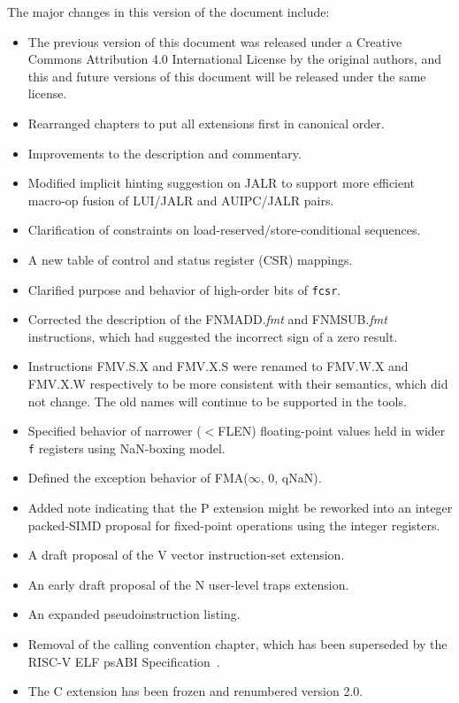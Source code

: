 The major changes in this version of the document include:
\begin{itemize}
\parskip 0pt
\itemsep 1pt
\item The previous version of this document was released under a
  Creative Commons Attribution 4.0 International License by the
  original authors, and this and future versions of this document will
  be released under the same license.
\item Rearranged chapters to put all extensions first in canonical order.
\item Improvements to the description and commentary.
\item Modified implicit hinting suggestion on JALR to support more efficient
  macro-op fusion of LUI/JALR and AUIPC/JALR pairs.
\item Clarification of constraints on load-reserved/store-conditional sequences.
\item A new table of control and status register (CSR) mappings.
\item Clarified purpose and behavior of high-order bits of {\tt fcsr}.
\item Corrected the description of the FNMADD.{\em fmt} and FNMSUB.{\em fmt}
      instructions, which had suggested the incorrect sign of a zero result.
\item Instructions FMV.S.X and FMV.X.S were renamed to FMV.W.X and
  FMV.X.W respectively to be more consistent with their
  semantics, which did not change.
  The old names will continue to be supported in the tools.
\item Specified behavior of narrower ($<$FLEN) floating-point values held in
  wider {\tt f} registers using NaN-boxing model.
\item Defined the exception behavior of FMA($\infty$, 0, qNaN).
\item Added note indicating that the P extension might be reworked
  into an integer packed-SIMD proposal for fixed-point operations
  using the integer registers.
\item A draft proposal of the V vector instruction-set extension.
\item An early draft proposal of the N user-level traps extension.
\item An expanded pseudoinstruction listing.
\item Removal of the calling convention chapter, which has been superseded by
      the RISC-V ELF psABI Specification~\cite{riscv-elf-psabi}.
\item The C extension has been frozen and renumbered version 2.0.
\end{itemize}


